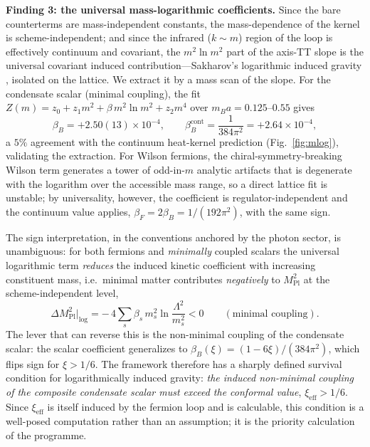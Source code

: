 \documentclass[11pt,a4paper]{article}
\begin{document}
\textbf{Finding 3: the universal mass-logarithmic coefficients.}
Since the bare counterterms are mass-independent constants, the
mass-dependence of the kernel is scheme-independent; and since the
infrared ($k \sim m$) region of the loop is effectively continuum
and covariant, the $m^2\ln m^2$ part of the axis-TT slope is the
universal covariant induced contribution---Sakharov's logarithmic
induced gravity \cite{Sakharov:1967pk,Visser:2002ew}, isolated on
the lattice.
We extract it by a mass scan of the slope.
For the condensate scalar (minimal coupling), the fit
$Z(m) = z_0 + z_1 m^2 + \beta\,m^2\ln m^2 + z_2 m^4$ over
$m_B a = 0.125$--$0.55$ gives
\begin{equation}
\beta_B = +2.50(13)\times10^{-4},
\qquad
\beta_B^{\mathrm{cont}} = \frac{1}{384\pi^2} = +2.64\times10^{-4},
\label{eq:betaB}
\end{equation}
a $5\%$ agreement with the continuum heat-kernel prediction
(Fig.~\ref{fig:mlog}), validating the extraction.
For Wilson fermions, the chiral-symmetry-breaking Wilson term
generates a tower of odd-in-$m$ analytic artifacts that is
degenerate with the logarithm over the accessible mass range, so a
direct lattice fit is unstable; by universality, however, the
coefficient is regulator-independent and the continuum value
applies, $\beta_F = 2\beta_B = 1/(192\pi^2)$, with the same sign.

The sign interpretation, in the conventions anchored by the photon
sector, is unambiguous: for both fermions and \emph{minimally}
coupled scalars the universal logarithmic term \emph{reduces} the
induced kinetic coefficient with increasing constituent mass,
i.e.\ minimal matter contributes \emph{negatively} to
$M_{\mathrm{Pl}}^2$ at the scheme-independent level,
\begin{equation}
\Delta M_{\mathrm{Pl}}^2\big|_{\log}
= -\,4\sum_s \beta_s\, m_s^2 \ln\!\frac{\Lambda^2}{m_s^2} < 0
\qquad (\text{minimal coupling}).
\label{eq:Mlog}
\end{equation}
The lever that can reverse this is the non-minimal coupling of the
condensate scalar: the scalar coefficient generalizes to
$\beta_B(\xi) = (1 - 6\xi)/(384\pi^2)$, which flips sign for
$\xi > 1/6$.
The framework therefore has a sharply defined survival condition
for logarithmically induced gravity: \emph{the induced non-minimal
coupling of the composite condensate scalar must exceed the
conformal value}, $\xi_{\mathrm{eff}} > 1/6$.
Since $\xi_{\mathrm{eff}}$ is itself induced by the fermion loop
and is calculable, this condition is a well-posed computation
rather than an assumption; it is the priority calculation of the
programme.
\end{document}
